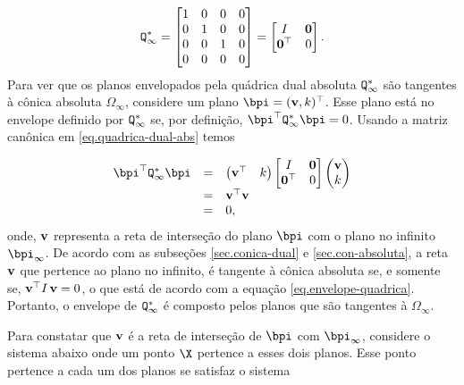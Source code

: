 \begin{equation}\label{eq.quadrica-dual-abs}
{\tt Q}^*_\infty=
\begin{bmatrix}
1&0&0&0\\
0&1&0&0\\
0&0&1&0\\
0&0&0&0
\end{bmatrix}=
\begin{bmatrix}
I&{\bf 0}\\
{\bf 0}^\top&0
\end{bmatrix}.
\end{equation}
Para ver que os planos envelopados pela quádrica dual absoluta ${\tt Q}^*_\infty$ são tangentes à cônica absoluta $\Omega_\infty$, considere um plano $\bpi=({\bf v}, k)^\top$. Esse plano está no envelope definido por ${\tt Q}^*_\infty$ se, por definição, $\bpi^\top {\tt Q}^*_\infty\bpi=0$. Usando a matriz canônica em \ref{eq.quadrica-dual-abs} temos

\begin{equation}\label{eq.envelope-quadrica}
\begin{array}{rcl}
\bpi^\top {\tt Q}^*_\infty\bpi&=&
\begin{pmatrix}
{\bf v}^\top&k
\end{pmatrix}
\begin{bmatrix}
I&{\bf 0}\\
{\bf 0}^\top&0
\end{bmatrix}
\begin{pmatrix}
{\bf v}\\
k
\end{pmatrix}\\
&=&{\bf v}^\top {\bf v}\\
&=&0,
\end{array}
\end{equation}
onde, ${\bf v}$ representa a reta de interseção do plano $\bpi$ com o plano no infinito $\bpi_\infty$. De acordo com as subseções \ref{sec.conica-dual} e \ref{sec.con-absoluta}, a reta ${\bf v}$ que pertence ao plano no infinito, é tangente à cônica absoluta se, e somente se, ${\bf v}^\top I\,{\bf v}=0$, o que está de acordo com a equação \ref{eq.envelope-quadrica}. Portanto, o envelope de ${\tt Q}^*_\infty$ é composto pelos planos que são tangentes à $\Omega_\infty$. 

Para constatar que ${\bf v}$ é a reta de interseção de $\bpi$ com $\bpi_\infty$, considere o sistema abaixo onde um ponto $\X$ pertence a esses dois planos. Esse ponto pertence a cada um dos planos se satisfaz o sistema

